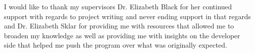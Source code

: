 I would like to thank my supervisors Dr. Elizabeth Black for her continued support with regards to project writing and never ending support in that regards and Dr. Elizabeth Sklar for providing me with resources that allowed me to broaden my knowledge as well as providing me with insights on the developer side that helped me push the program over what was originally expected.